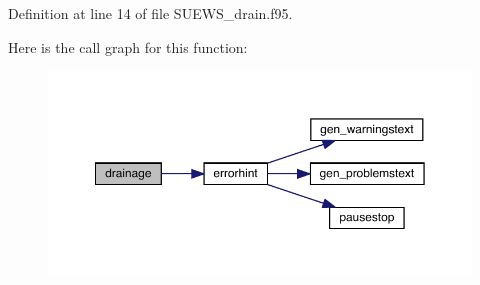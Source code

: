 Definition at line 14 of file S\+U\+E\+W\+S\+\_\+drain.\+f95.

Here is the call graph for this function\+:\nopagebreak
\begin{figure}[H]
\begin{center}
\leavevmode
\includegraphics[width=350pt]{_s_u_e_w_s__drain_8f95_ad457462534fc9fec206ac998199dcb8d_cgraph}
\end{center}
\end{figure}
